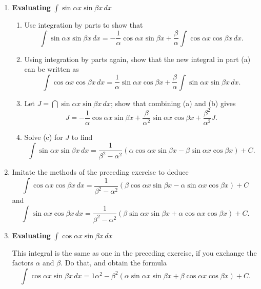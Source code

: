 \begin{enumerate}
\begin{enumerate}
  \item Show that your results in (a) and (b) are compatible.  (For
example, use exercise 15~(a).)


\end{enumerate}
\item 

{\bf Evaluating }${\displaystyle \int \sin{\alpha x} \sin{\beta x}\, dx}$



  \begin{enumerate}
  \item Use integration by parts to show that
	\[
\int \sin{\alpha x} \sin{\beta x}\, dx =
		-\dfrac{1}{\alpha} \cos{\alpha x} \sin{\beta x}
		+ \dfrac{\beta}{\alpha} 
		\int \cos{\alpha x} \cos{\beta x}\, dx.
\]


  \item Using integration by parts again, show that the new integral in
part (a) can be written as
	\[
\int \cos{\alpha x} \cos{\beta x}\, dx =
		\dfrac{1}{\alpha} \sin{\alpha x} \cos{\beta x}
		+ \dfrac{\beta}{\alpha} 
		\int \sin{\alpha x} \sin{\beta x}\, dx.
\]


  \item Let $J = \dint \sin{\alpha x} \sin{\beta x}\, dx$; show that
combining (a) and (b) gives
	\[
J = -\dfrac{1}{\alpha} \cos{\alpha x} \sin{\beta x}
	+ \dfrac{\beta}{\alpha^2} \sin{\alpha x} \cos{\beta x}
	+ \dfrac{\beta^2}{\alpha^2} J.
\]


  \item Solve (c) for $J$ to find
	\[
\int \sin{\alpha x} \sin{\beta x}\, dx = 
	 \dfrac{1}{\beta^2 - \alpha^2}
		(\alpha \cos{\alpha x} \sin{\beta x} 
		- \beta \sin{\alpha x} \cos{\beta x}) + C.
\]


\end{enumerate}
\item Imitate the methods of the preceding exercise to deduce		%
	\[
\int \cos{\alpha x} \cos{\beta x}\, dx =
	\dfrac{1}{\beta^2 - \alpha^2} 
		(\beta \cos{\alpha x} \sin{\beta x} 
		- \alpha \sin{\alpha x} \cos{\beta x}) + C
\]
and
	\[
\int \sin{\alpha x} \cos{\beta x}\, dx =
	\dfrac{1}{\beta^2 - \alpha^2}
		(\beta \sin{\alpha x} \sin{\beta x} 
		+ \alpha \cos{\alpha x} \cos{\beta x}) + C.
\]


\item 

{\bf Evaluating }${\displaystyle \int \cos{\alpha x} \sin{\beta x}\, dx}$



This integral is the same as one in the preceding exercise, if you exchange the factors $\alpha$ and $\beta$.  Do that, and obtain the formula  %
	\[
\int \cos{\alpha x} \sin{\beta x}\, dx =
	{1}{\alpha^2 - \beta^2} 
		(\alpha \sin{\alpha x} \sin{\beta x} 
		+ \beta \cos{\alpha x} \cos{\beta x}) +C.
\]





\end{enumerate}
